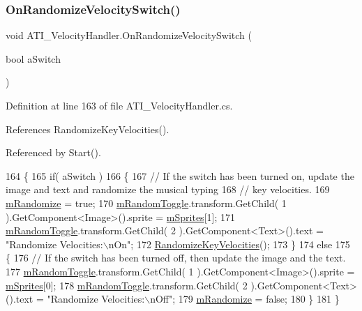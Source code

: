 \subsubsection{\texorpdfstring{On\+Randomize\+Velocity\+Switch()}{OnRandomizeVelocitySwitch()}}
{\footnotesize\ttfamily void A\+T\+I\+\_\+\+Velocity\+Handler.\+On\+Randomize\+Velocity\+Switch (\begin{DoxyParamCaption}\item[{bool}]{a\+Switch }\end{DoxyParamCaption})}



Definition at line 163 of file A\+T\+I\+\_\+\+Velocity\+Handler.\+cs.



References Randomize\+Key\+Velocities().



Referenced by Start().


\begin{DoxyCode}
164     \{
165         \textcolor{keywordflow}{if}( aSwitch )
166         \{
167             \textcolor{comment}{// If the switch has been turned on, update the image and text and randomize the musical typing}
168             \textcolor{comment}{// key velocities.}
169             \hyperlink{class_a_t_i___velocity_handler_aa6f4ac16382d37eb2c66fb358ac87301}{mRandomize} = \textcolor{keyword}{true};
170             \hyperlink{class_a_t_i___velocity_handler_a6ca709a10f8b2eb0f1141c589e7f9742}{mRandomToggle}.transform.GetChild( 1 ).GetComponent<Image>().sprite = 
      \hyperlink{class_a_t_i___velocity_handler_a7e2452c41bbcdd313afb2e53fac4a975}{mSprites}[1];
171             \hyperlink{class_a_t_i___velocity_handler_a6ca709a10f8b2eb0f1141c589e7f9742}{mRandomToggle}.transform.GetChild( 2 ).GetComponent<Text>().text = \textcolor{stringliteral}{"Randomize
       Velocities:\(\backslash\)nOn"};
172             \hyperlink{class_a_t_i___velocity_handler_aa1a10281dafc6666677e4255ad663dde}{RandomizeKeyVelocities}();
173         \}
174         \textcolor{keywordflow}{else}
175         \{
176             \textcolor{comment}{// If the switch has been turned off, then update the image and the text.}
177             \hyperlink{class_a_t_i___velocity_handler_a6ca709a10f8b2eb0f1141c589e7f9742}{mRandomToggle}.transform.GetChild( 1 ).GetComponent<Image>().sprite = 
      \hyperlink{class_a_t_i___velocity_handler_a7e2452c41bbcdd313afb2e53fac4a975}{mSprites}[0];
178             \hyperlink{class_a_t_i___velocity_handler_a6ca709a10f8b2eb0f1141c589e7f9742}{mRandomToggle}.transform.GetChild( 2 ).GetComponent<Text>().text = \textcolor{stringliteral}{"Randomize
       Velocities:\(\backslash\)nOff"};
179             \hyperlink{class_a_t_i___velocity_handler_aa6f4ac16382d37eb2c66fb358ac87301}{mRandomize} = \textcolor{keyword}{false};
180         \}
181     \}
\end{DoxyCode}
\mbox{\label{class_a_t_i___velocity_handler_aa1a10281dafc6666677e4255ad663dde}} 

